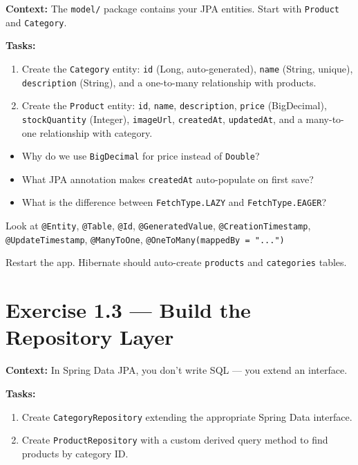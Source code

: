 \documentclass[12pt,a4paper]{report}
\begin{document}
\textbf{Context:} The \texttt{model/} package contains your JPA entities. Start with \texttt{Product} and \texttt{Category}.

\textbf{Tasks:}
\begin{enumerate}
    \item Create the \texttt{Category} entity: \texttt{id} (Long, auto-generated), \texttt{name} (String, unique), \texttt{description} (String), and a one-to-many relationship with products.
    \item Create the \texttt{Product} entity: \texttt{id}, \texttt{name}, \texttt{description}, \texttt{price} (BigDecimal), \texttt{stockQuantity} (Integer), \texttt{imageUrl}, \texttt{createdAt}, \texttt{updatedAt}, and a many-to-one relationship with category.
\end{enumerate}

\begin{thinkbox}
\begin{itemize}
    \item Why do we use \texttt{BigDecimal} for price instead of \texttt{Double}?
    \item What JPA annotation makes \texttt{createdAt} auto-populate on first save?
    \item What is the difference between \texttt{FetchType.LAZY} and \texttt{FetchType.EAGER}?
\end{itemize}
\end{thinkbox}

\begin{hintbox}
Look at \texttt{@Entity}, \texttt{@Table}, \texttt{@Id}, \texttt{@GeneratedValue}, \texttt{@CreationTimestamp}, \texttt{@UpdateTimestamp}, \texttt{@ManyToOne}, \texttt{@OneToMany(mappedBy = "...")}
\end{hintbox}

\begin{checkpoint}
Restart the app. Hibernate should auto-create \texttt{products} and \texttt{categories} tables.
\end{checkpoint}

\section{Exercise 1.3 --- Build the Repository Layer}

\textbf{Context:} In Spring Data JPA, you don't write SQL --- you extend an interface.

\textbf{Tasks:}
\begin{enumerate}
    \item Create \texttt{CategoryRepository} extending the appropriate Spring Data interface.
    \item Create \texttt{ProductRepository} with a custom derived query method to find products by category ID.
\end{enumerate}
\end{document}
